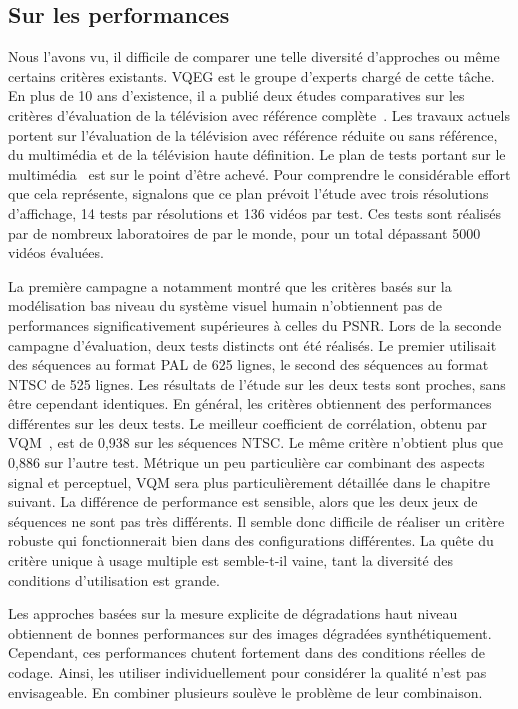 \subsection{Sur les performances}
Nous l'avons vu, il difficile de comparer une telle diversité d'approches ou même certains critères existants. VQEG est le groupe d'experts chargé de cette tâche. En plus de 10 ans d'existence, il a publié deux études comparatives sur les critères d'évaluation de la télévision avec référence complète~\cite{vqeg-frtv1,vqeg-frtv2}. Les travaux actuels portent sur l'évaluation de la télévision avec référence réduite ou sans référence, du multimédia et de la télévision haute définition. Le plan de tests portant sur le multimédia~\cite{vqeg-MMtestplan} est sur le point d'être achevé. Pour comprendre le considérable effort que cela représente, signalons que ce plan prévoit l'étude avec trois résolutions d'affichage, 14 tests par résolutions et 136 vidéos par test. Ces tests sont réalisés par de nombreux laboratoires de par le monde, pour un total dépassant 5000 vidéos évaluées.

La première campagne a notamment montré que les critères basés sur la modélisation bas niveau du système visuel humain n'obtiennent pas de performances significativement supérieures à celles du PSNR. Lors de la seconde campagne d'évaluation, deux tests distincts ont été réalisés. Le premier utilisait des séquences au format PAL de 625 lignes, le second des séquences au format NTSC de 525 lignes. Les résultats de l'étude sur les deux tests sont proches, sans être cependant identiques. En général, les critères obtiennent des performances différentes sur les deux tests. Le meilleur coefficient de corrélation, obtenu par VQM~\cite{wolf-vqmtech}, est de 0,938 sur les séquences NTSC. Le même critère n'obtient plus que 0,886 sur l'autre test. Métrique un peu particulière car combinant des aspects signal et perceptuel, VQM sera plus particulièrement détaillée dans le chapitre suivant. La différence de performance est sensible, alors que les deux jeux de séquences ne sont pas très différents. Il semble donc difficile de réaliser un critère robuste qui fonctionnerait bien dans des configurations différentes. La quête du critère unique à usage multiple est semble-t-il vaine, tant la diversité des conditions d'utilisation est grande.

Les approches basées sur la mesure explicite de dégradations haut niveau obtiennent de bonnes performances sur des images dégradées synthétiquement. Cependant, ces performances chutent fortement dans des conditions réelles de codage. Ainsi, les utiliser individuellement pour considérer la qualité n'est pas envisageable. En combiner plusieurs soulève le problème de leur combinaison. %


